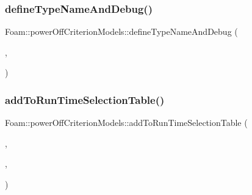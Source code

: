 \subsubsection{\texorpdfstring{define\+Type\+Name\+And\+Debug()}{defineTypeNameAndDebug()}\hspace{0.1cm}{\footnotesize\ttfamily [2/2]}}
{\footnotesize\ttfamily Foam\+::power\+Off\+Criterion\+Models\+::define\+Type\+Name\+And\+Debug (\begin{DoxyParamCaption}\item[{\hyperlink{classFoam_1_1powerOffCriterionModels_1_1timer}{timer}}]{,  }\item[{0}]{ }\end{DoxyParamCaption})}

\mbox{\label{namespaceFoam_1_1powerOffCriterionModels_ac71fbbd475c6b9c553966de9b72e8f1c}} 
\subsubsection{\texorpdfstring{add\+To\+Run\+Time\+Selection\+Table()}{addToRunTimeSelectionTable()}\hspace{0.1cm}{\footnotesize\ttfamily [2/2]}}
{\footnotesize\ttfamily Foam\+::power\+Off\+Criterion\+Models\+::add\+To\+Run\+Time\+Selection\+Table (\begin{DoxyParamCaption}\item[{\hyperlink{classFoam_1_1powerOffCriterionModel}{power\+Off\+Criterion\+Model}}]{,  }\item[{\hyperlink{classFoam_1_1powerOffCriterionModels_1_1timer}{timer}}]{,  }\item[{power\+Off\+Criterion\+Models}]{ }\end{DoxyParamCaption})}

